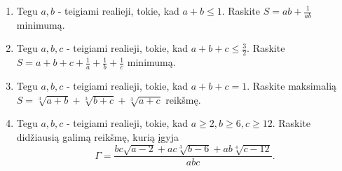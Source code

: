 \begin{enumerate}
  \item Tegu $a,b$ - teigiami realieji, tokie, kad $a+b\leq1$. Raskite
    $S=ab+\frac{1}{ab}$ minimumą.
  \item Tegu $a,b,c$ - teigiami realieji, tokie, kad
    $a+b+c\leq\frac{3}{2}$. Raskite
    $S=a+b+c+\frac{1}{a}+\frac{1}{b}+\frac{1}{c}$ minimumą.
  \item Tegu $a,b,c$ - teigiami realieji, tokie, kad $a+b+c=1$. Raskite
    maksimalią $S=\sqrt[3]{a+b}+\sqrt[3]{b+c}+\sqrt[3]{a+c}$ reikšmę.
  \item Tegu $a,b,c$ - teigiami realieji, tokie, kad
    $a\geq 2, b\geq 6, c\geq 12$. Raskite didžiausią galimą reikšmę, kurią
    įgyja
    $$\Gamma=\frac{bc\sqrt{a-2}+ac\sqrt[3]{b-6}+ab\sqrt[4]{c-12}}{abc}.$$

\end{enumerate}
